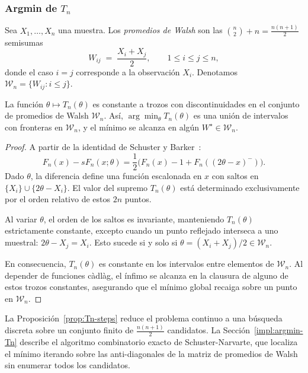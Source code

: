 \subsubsection{Argmin de $T_n$}

\begin{definicion}\label{def:walsh}
Sea $X_1,\dots,X_n$ una muestra. Los \emph{promedios de Walsh} son las $\binom{n}{2}+n=\tfrac{n(n+1)}{2}$ semisumas
\[
W_{ij} \;=\; \frac{X_i + X_j}{2}, \qquad 1\le i\le j\le n,
\]
donde el caso $i=j$ corresponde a la observación $X_i$. Denotamos $\mathcal{W}_n=\{W_{ij}:i\le j\}$.
\end{definicion}

\begin{proposicion}\label{prop:Tn-steps}
La función $\theta\mapsto T_n(\theta)$ es constante a trozos con discontinuidades en el conjunto de promedios de Walsh $\mathcal{W}_n$. Así, $\arg\min_\theta T_n(\theta)$ es una unión de intervalos con fronteras en $\mathcal{W}_n$, y el mínimo se alcanza en algún $W^\star\in\mathcal{W}_n$.
\end{proposicion}

\begin{proof}
A partir de la identidad de Schuster y Barker~\cite{schuster1987bootstrap}:
$$F_n(x)-sF_n(x;\theta) = \frac{1}{2}\bigl(F_n(x)-1+F_n((2\theta-x)^-)\bigr).$$
Dado $\theta$, la diferencia define una función escalonada en $x$ con saltos en $\{X_i\} \cup \{2\theta-X_i\}$. El valor del supremo $T_n(\theta)$ está determinado exclusivamente por el orden relativo de estos $2n$ puntos.

Al variar $\theta$, el orden de los saltos es invariante, manteniendo $T_n(\theta)$ estrictamente constante, excepto cuando un punto reflejado interseca a uno muestral: $2\theta-X_j = X_i$. Esto sucede si y solo si $\theta = (X_i+X_j)/2 \in \mathcal{W}_n$.

En consecuencia, $T_n(\theta)$ es constante en los intervalos entre elementos de $\mathcal{W}_n$. Al depender de funciones càdlàg, el ínfimo se alcanza en la clausura de alguno de estos trozos constantes, asegurando que el mínimo global recaiga sobre un punto en $\mathcal{W}_n$.
\end{proof}

La Proposición~\ref{prop:Tn-steps} reduce el problema continuo a una búsqueda discreta sobre un conjunto finito de $\tfrac{n(n+1)}{2}$ candidatos. La Sección~\ref{impl:argmin-Tn} describe el algoritmo combinatorio exacto de Schuster-Narvarte, que localiza el mínimo iterando sobre las anti-diagonales de la matriz de promedios de Walsh sin enumerar todos los candidatos.


